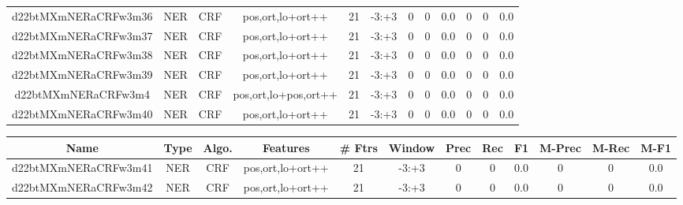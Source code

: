 \documentclass[a4paper]{article}
\begin{document}
\begin{landscape}
\begin{center}
\begin{tabular}{ |c|c|c|c|c|c|c|c|c|c|c|c|}
 
 	
 	\small{ d22btMXmNERaCRFw3m36 } & \small{ NER} & \small{  CRF }  & pos,ort,lo+ort++  &  21 &  \small{  -3:+3 }  &  0 & 0 & 0.0  &  0 & 0 & 0.0 \\
 	

 
 	
 	\small{ d22btMXmNERaCRFw3m37 } & \small{ NER} & \small{  CRF }  & pos,ort,lo+ort++  &  21 &  \small{  -3:+3 }  &  0 & 0 & 0.0  &  0 & 0 & 0.0 \\
 	

 
 	
 	\small{ d22btMXmNERaCRFw3m38 } & \small{ NER} & \small{  CRF }  & pos,ort,lo+ort++  &  21 &  \small{  -3:+3 }  &  0 & 0 & 0.0  &  0 & 0 & 0.0 \\
 	

 
 	
 	\small{ d22btMXmNERaCRFw3m39 } & \small{ NER} & \small{  CRF }  & pos,ort,lo+ort++  &  21 &  \small{  -3:+3 }  &  0 & 0 & 0.0  &  0 & 0 & 0.0 \\
 	

 
 	
 	\small{ d22btMXmNERaCRFw3m4 } & \small{ NER} & \small{  CRF }  & pos,ort,lo+pos,ort++  &  21 &  \small{  -3:+3 }  &  0 & 0 & 0.0  &  0 & 0 & 0.0 \\
 	

 
 	
 	\small{ d22btMXmNERaCRFw3m40 } & \small{ NER} & \small{  CRF }  & pos,ort,lo+ort++  &  21 &  \small{  -3:+3 }  &  0 & 0 & 0.0  &  0 & 0 & 0.0 \\
 	
 \hline
\end{tabular}
\end{center}




\begin{center}
\begin{tabular}{ |c|c|c|c|c|c|c|c|c|c|c|c|} 
 \hline
 	Name & Type & Algo. & Features & \# Ftrs & Window & Prec & Rec & F1 & M-Prec & M-Rec & M-F1\\
 \hline

 	

 
 	
 	\small{ d22btMXmNERaCRFw3m41 } & \small{ NER} & \small{  CRF }  & pos,ort,lo+ort++  &  21 &  \small{  -3:+3 }  &  0 & 0 & 0.0  &  0 & 0 & 0.0 \\
 	

 
 	
 	\small{ d22btMXmNERaCRFw3m42 } & \small{ NER} & \small{  CRF }  & pos,ort,lo+ort++  &  21 &  \small{  -3:+3 }  &  0 & 0 & 0.0  &  0 & 0 & 0.0 \\
 	


\end{tabular}
\end{center}
\end{landscape}
\end{document}

